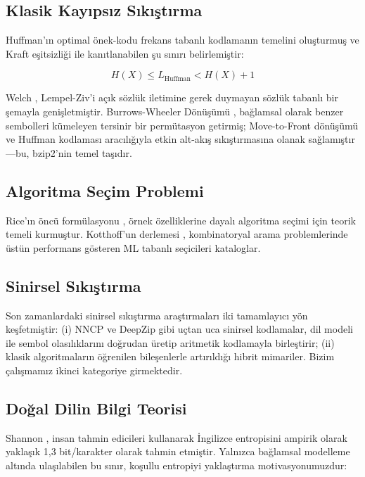 \documentclass[conference]{IEEEtran}
\begin{document}
\subsection{Klasik Kayıpsız Sıkıştırma}

Huffman'ın optimal önek-kodu \cite{huffman1952} frekans tabanlı kodlamanın temelini oluşturmuş ve Kraft eşitsizliği \cite{cover2006} ile kanıtlanabilen şu sınırı belirlemiştir:

\begin{equation}
H(X) \leq L_{\text{Huffman}} < H(X) + 1
\label{eq:huffman_bound}
\end{equation}

Welch \cite{welch1984}, Lempel-Ziv'i \cite{ziv1977} açık sözlük iletimine gerek duymayan sözlük tabanlı bir şemayla genişletmiştir. Burrows-Wheeler Dönüşümü \cite{burrows1994}, bağlamsal olarak benzer sembolleri kümeleyen tersinir bir permütasyon getirmiş; Move-to-Front dönüşümü \cite{bentley1986} ve Huffman kodlaması aracılığıyla etkin alt-akış sıkıştırmasına olanak sağlamıştır---bu, bzip2'nin temel taşıdır.

\subsection{Algoritma Seçim Problemi}

Rice'ın öncü formülasyonu \cite{rice1976}, örnek özelliklerine dayalı algoritma seçimi için teorik temeli kurmuştur. Kotthoff'un derlemesi \cite{kotthoff2014}, kombinatoryal arama problemlerinde üstün performans gösteren ML tabanlı seçicileri kataloglar.

\subsection{Sinirsel Sıkıştırma}

Son zamanlardaki sinirsel sıkıştırma araştırmaları iki tamamlayıcı yön keşfetmiştir: (i) NNCP \cite{nncp} ve DeepZip \cite{deepzip} gibi uçtan uca sinirsel kodlamalar, dil modeli ile sembol olasılıklarını doğrudan üretip aritmetik kodlamayla birleştirir; (ii) klasik algoritmaların öğrenilen bileşenlerle artırıldığı hibrit mimariler. Bizim çalışmamız ikinci kategoriye girmektedir.

\subsection{Doğal Dilin Bilgi Teorisi}

Shannon \cite{shannon1951}, insan tahmin edicileri kullanarak İngilizce entropisini ampirik olarak yaklaşık 1,3 bit/karakter olarak tahmin etmiştir. Yalnızca bağlamsal modelleme altında ulaşılabilen bu sınır, koşullu entropiyi yaklaştırma motivasyonumuzdur:
\end{document}
